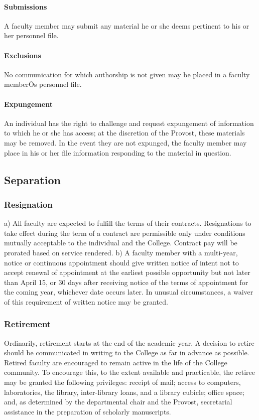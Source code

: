 \documentclass[letterpaper, 11pt]{article}
\begin{document}
			\paragraph{Submissions}
				A faculty member may submit any material he or she deems pertinent to his or her personnel file.
			\paragraph{Exclusions}
				No communication for which authorship is not given may be placed in a faculty memberÕs personnel file.
			\paragraph{Expungement}
				An individual has the right to challenge and request expungement of information to which he or she has access; at the discretion of the Provost, these materials may be removed.  In the event they are not expunged, the faculty member may place in his or her file information responding to the material in question.
	\subsection{Separation}
		\subsubsection{Resignation}
			a) All faculty are expected to fulfill the terms of their contracts.  Resignations to take effect during the term of a contract are permissible only under conditions mutually acceptable to the individual and the College.  Contract pay will be prorated based on service rendered.
			b) A faculty member with a multi-year, notice or continuous appointment should give written notice of intent not to accept renewal of appointment at the earliest possible opportunity but not later than April 15, or 30 days after receiving notice of the terms of appointment for the coming year, whichever date occurs later. In unusual circumstances, a waiver of this requirement of written notice may be granted.
		\subsubsection{Retirement}
			Ordinarily, retirement starts at the end of the academic year.  A decision to retire should be communicated in writing to the College as far in advance as possible.  Retired faculty are encouraged to remain active in the life of the College community.  To encourage this, to the extent available and practicable, the retiree may be granted the following privileges:  receipt of mail; access to computers, laboratories, the library, inter-library loans, and a library cubicle; office space; and, as determined by the departmental chair and the Provost, secretarial assistance in the preparation of scholarly manuscripts.
\end{document}
